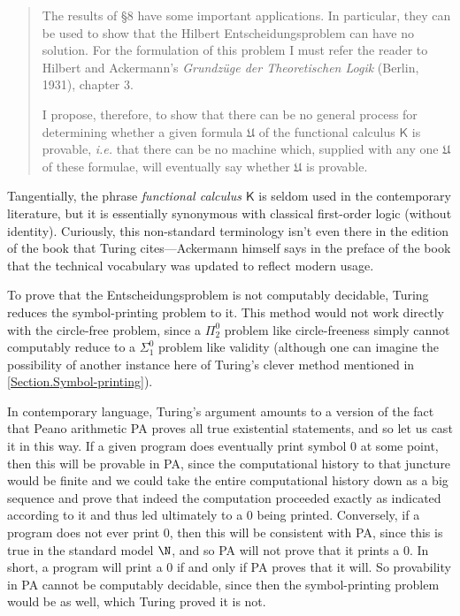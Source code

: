 \documentclass[12pt]{amsart}
\begin{document}
\begin{quote}\small

\hspace{1em} The results of §8 have some important applications. In particular, they can be used to show that the Hilbert Entscheidungsproblem can have no solution. For the formulation of this problem I must refer the reader to Hilbert and Ackermann's \textit{Grundzüge der Theoretischen Logik} (Berlin, 1931), chapter 3. 

I propose, therefore, to show that there can be no general process for determining whether a given formula $\mathfrak{U}$ of the functional calculus $\mathsf{K}$ is provable, \textit{i.e.} that there can be no machine which, supplied with any one $\mathfrak{U}$ of these formulae, will eventually say whether $\mathfrak{U}$ is provable. \cite[§11, p. 259]{Turing1936:On-computable-numbers}
\end{quote}

Tangentially, the phrase \textit{functional calculus $\mathsf{K}$} is seldom used in the contemporary literature, but it is essentially synonymous with classical first-order logic (without identity). Curiously, this non-standard terminology isn't even there in the edition of the book that Turing cites---Ackermann himself says in the preface of the book that the technical vocabulary was updated to reflect modern usage.

To prove that the Entscheidungsproblem is not computably decidable, Turing reduces the symbol-printing problem to it. This method would not work directly with the circle-free problem, since a $\Pi^0_2$ problem like circle-freeness simply cannot computably reduce to a $\Sigma^0_1$ problem like validity (although one can imagine the possibility of another instance here of Turing's clever method mentioned in \ref{Section.Symbol-printing}).

In contemporary language, Turing's argument amounts to a version of the fact that Peano arithmetic PA proves all true existential statements, and so let us cast it in this way. If a given program does eventually print symbol $0$ at some point, then this will be provable in PA, since the computational history to that juncture would be finite and we could take the entire computational history down as a big sequence and prove that indeed the computation proceeded exactly as indicated according to it and thus led ultimately to a $0$ being printed. Conversely, if a program does not ever print $0$, then this will be consistent with PA, since this is true in the standard model $\N$, and so PA will not prove that it prints a $0$. In short, a program will print a $0$ if and only if PA proves that it will. So provability in PA cannot be computably decidable, since then the symbol-printing problem would be as well, which Turing proved it is not.
\end{document}
